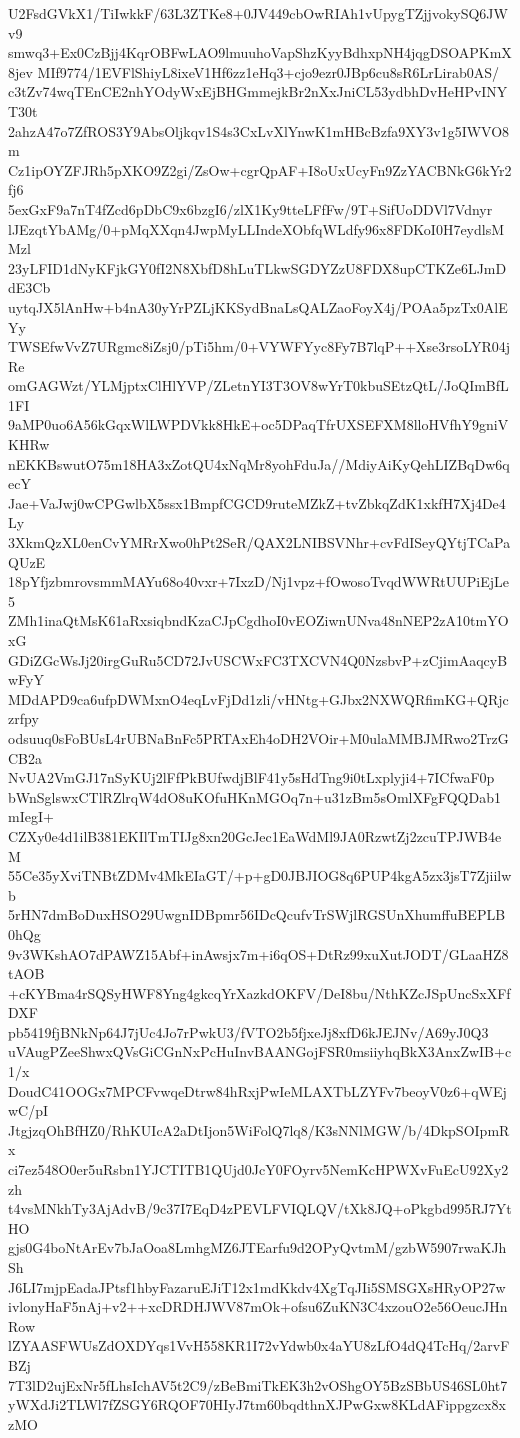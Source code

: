U2FsdGVkX1/TiIwkkF/63L3ZTKe8+0JV449cbOwRIAh1vUpygTZjjvokySQ6JWv9
smwq3+Ex0CzBjj4KqrOBFwLAO9lmuuhoVapShzKyyBdhxpNH4jqgDSOAPKmX8jev
MIf9774/1EVFlShiyL8ixeV1Hf6zz1eHq3+cjo9ezr0JBp6cu8sR6LrLirab0AS/
c3tZv74wqTEnCE2nhYOdyWxEjBHGmmejkBr2nXxJniCL53ydbhDvHeHPvINYT30t
2ahzA47o7ZfROS3Y9AbsOljkqv1S4s3CxLvXlYnwK1mHBcBzfa9XY3v1g5IWVO8m
Cz1ipOYZFJRh5pXKO9Z2gi/ZsOw+cgrQpAF+I8oUxUcyFn9ZzYACBNkG6kYr2fj6
5exGxF9a7nT4fZcd6pDbC9x6bzgI6/zlX1Ky9tteLFfFw/9T+SifUoDDVl7Vdnyr
lJEzqtYbAMg/0+pMqXXqn4JwpMyLLIndeXObfqWLdfy96x8FDKoI0H7eydlsMMzl
23yLFID1dNyKFjkGY0fI2N8XbfD8hLuTLkwSGDYZzU8FDX8upCTKZe6LJmDdE3Cb
uytqJX5lAnHw+b4nA30yYrPZLjKKSydBnaLsQALZaoFoyX4j/POAa5pzTx0AlEYy
TWSEfwVvZ7URgmc8iZsj0/pTi5hm/0+VYWFYyc8Fy7B7lqP++Xse3rsoLYR04jRe
omGAGWzt/YLMjptxClHlYVP/ZLetnYI3T3OV8wYrT0kbuSEtzQtL/JoQImBfL1FI
9aMP0uo6A56kGqxWlLWPDVkk8HkE+oc5DPaqTfrUXSEFXM8lloHVfhY9gniVKHRw
nEKKBswutO75m18HA3xZotQU4xNqMr8yohFduJa//MdiyAiKyQehLIZBqDw6qecY
Jae+VaJwj0wCPGwlbX5ssx1BmpfCGCD9ruteMZkZ+tvZbkqZdK1xkfH7Xj4De4Ly
3XkmQzXL0enCvYMRrXwo0hPt2SeR/QAX2LNIBSVNhr+cvFdISeyQYtjTCaPaQUzE
18pYfjzbmrovsmmMAYu68o40vxr+7IxzD/Nj1vpz+fOwosoTvqdWWRtUUPiEjLe5
ZMh1inaQtMsK61aRxsiqbndKzaCJpCgdhoI0vEOZiwnUNva48nNEP2zA10tmYOxG
GDiZGcWsJj20irgGuRu5CD72JvUSCWxFC3TXCVN4Q0NzsbvP+zCjimAaqcyBwFyY
MDdAPD9ca6ufpDWMxnO4eqLvFjDd1zli/vHNtg+GJbx2NXWQRfimKG+QRjczrfpy
odsuuq0sFoBUsL4rUBNaBnFc5PRTAxEh4oDH2VOir+M0ulaMMBJMRwo2TrzGCB2a
NvUA2VmGJ17nSyKUj2lFfPkBUfwdjBlF41y5sHdTng9i0tLxplyji4+7ICfwaF0p
bWnSglswxCTlRZlrqW4dO8uKOfuHKnMGOq7n+u31zBm5sOmlXFgFQQDab1mIegI+
CZXy0e4d1ilB381EKIlTmTIJg8xn20GcJec1EaWdMl9JA0RzwtZj2zcuTPJWB4eM
55Ce35yXviTNBtZDMv4MkEIaGT/+p+gD0JBJIOG8q6PUP4kgA5zx3jsT7Zjiilwb
5rHN7dmBoDuxHSO29UwgnIDBpmr56IDcQcufvTrSWjlRGSUnXhumffuBEPLB0hQg
9v3WKshAO7dPAWZ15Abf+inAwsjx7m+i6qOS+DtRz99xuXutJODT/GLaaHZ8tAOB
+cKYBma4rSQSyHWF8Yng4gkcqYrXazkdOKFV/DeI8bu/NthKZcJSpUncSxXFfDXF
pb5419fjBNkNp64J7jUc4Jo7rPwkU3/fVTO2b5fjxeJj8xfD6kJEJNv/A69yJ0Q3
uVAugPZeeShwxQVsGiCGnNxPcHuInvBAANGojFSR0msiiyhqBkX3AnxZwIB+c1/x
DoudC41OOGx7MPCFvwqeDtrw84hRxjPwIeMLAXTbLZYFv7beoyV0z6+qWEjwC/pI
JtgjzqOhBfHZ0/RhKUIcA2aDtIjon5WiFolQ7lq8/K3sNNlMGW/b/4DkpSOIpmRx
ci7ez548O0er5uRsbn1YJCTITB1QUjd0JcY0FOyrv5NemKcHPWXvFuEcU92Xy2zh
t4vsMNkhTy3AjAdvB/9c37I7EqD4zPEVLFVIQLQV/tXk8JQ+oPkgbd995RJ7YtHO
gjs0G4boNtArEv7bJaOoa8LmhgMZ6JTEarfu9d2OPyQvtmM/gzbW5907rwaKJhSh
J6LI7mjpEadaJPtsf1hbyFazaruEJiT12x1mdKkdv4XgTqJIi5SMSGXsHRyOP27w
ivlonyHaF5nAj+v2++xcDRDHJWV87mOk+ofsu6ZuKN3C4xzouO2e56OeucJHnRow
lZYAASFWUsZdOXDYqs1VvH558KR1I72vYdwb0x4aYU8zLfO4dQ4TcHq/2arvFBZj
7T3lD2ujExNr5fLhsIchAV5t2C9/zBeBmiTkEK3h2vOShgOY5BzSBbUS46SL0ht7
yWXdJi2TLWl7fZSGY6RQOF70HIyJ7tm60bqdthnXJPwGxw8KLdAFippgzcx8xzMO
